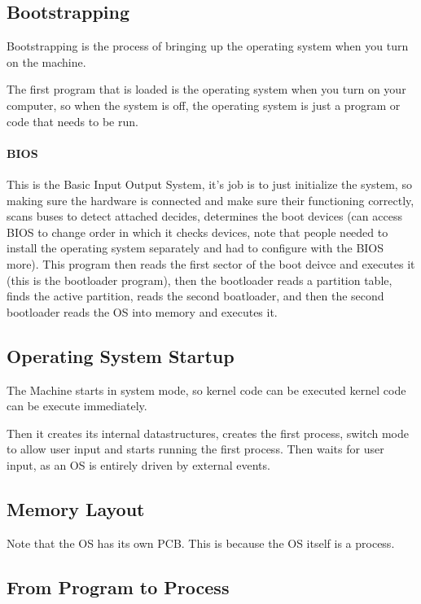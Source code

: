 \documentclass{article}
\begin{document}
\subsection{Bootstrapping}

Bootstrapping is the process of bringing up the operating system when you turn on the machine.

The first program that is loaded is the operating system when you turn on your computer, so when the system is off, the operating system is just a program or code that needs to be run.

\paragraph{BIOS} This is the Basic Input Output System, it's job is to just initialize the system, so making sure the hardware is connected and make sure their functioning correctly, scans buses to detect attached decides, determines the boot devices (can access BIOS to change order in which it checks devices, note that people needed to install the operating system separately and had to configure with the BIOS more). This program then reads the first sector of the boot deivce and executes it (this is the bootloader program), then the bootloader reads a partition table, finds the active partition, reads the second boatloader, and then the second bootloader reads the OS into memory and executes it.

\subsection{Operating System Startup}

The Machine starts in system mode, so kernel code can be executed kernel code can be execute immediately.

Then it creates its internal datastructures, creates the first process, switch mode to allow user input and starts running the first process. Then waits for user input, as an OS is entirely driven by external events.

\subsection{Memory Layout}

Note that the OS has its own PCB. This is because the OS itself is a process.

\subsection{From Program to Process}
\end{document}
